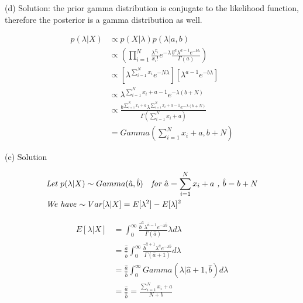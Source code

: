 \documentclass[11pt]{report}
\begin{document}
 \pagebreak

\justify
(d) Solution: the prior gamma distribution is conjugate to the likelihood function, therefore the posterior is a gamma distribution as well. 

\begin{equation*}
\begin{split}
p(\lambda|X) &\propto p(X|\lambda) p(\lambda|a,b) \\
&\propto (\prod_{i=1}^N\frac{\lambda^{x_i}}{x_i!} e^{-\lambda} \frac{b^a\lambda^{a-1}e^{-b\lambda}}{\Gamma(a)}) \\
&\propto [\lambda^{\sum_{i=1}^Nx_i} e^{-N\lambda}][\lambda^{a-1}e^{-b\lambda}] \\
&\propto \lambda^{\sum_{i=1}^Nx_i + a - 1} e^{-\lambda(b + N)} \\
&\propto \frac{b^{\sum_{i=1}^Nx_i + a}\lambda^{\sum_{i=1}^Nx_i + a - 1} e^{-\lambda(b + N)}}{\Gamma(\sum_{i=1}^Nx_i + a)} \\
& = \textit{Gamma}(\sum_{i=1}^Nx_i + a, b + N)
\end{split}
\end{equation*}

\justify
(e) Solution

\begin{align*}
&\textit{Let $p(\lambda|X) \sim Gamma(\hat{a}, \hat{b})$ \; for $\hat{a} = \sum_{i=1}^Nx_i + a$ , $\hat{b} = b+ N $} \\
&\textit{We have $\sim Var[\lambda|X] = E[\lambda^2] - E[\lambda]^2$}
\end{align*}

\begin{equation*}
\begin{split}
E[\lambda|X] &= \int^{\infty}_0\frac{ \hat{b}^{\hat{a} } \lambda^{\hat{a} - 1} e^{-\lambda\hat{b}}}{\Gamma(\hat{a})} \lambda d\lambda \\
&= \frac{\hat{a}}{\hat{b}} \int^{\infty}_0 \frac{\hat{b}^{\hat{a} + 1} \lambda^{\hat{a}} e^{-\lambda \hat{b}} }{\Gamma{(\hat{a} + 1)}} d\lambda \\
&= \frac{\hat{a}}{\hat{b}} \int^{\infty}_0 Gamma(\lambda|\hat{a} + 1, \hat{b}) d\lambda \\
&= \frac{\hat{a}}{\hat{b}} = \frac{{\sum_{i=1}^N{x_i}} + a}{N + b} \\
\end{split} 
\end{equation*}
\end{document}
